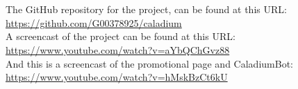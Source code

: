 \begin{appendices}
\renewcommand{\chaptername}{Appendix A}
\renewcommand{\thechapter}{A}
\chapter{}
The GitHub repository for the project, can be found at this URL: \\
\href{https://github.com/G00378925/caladium}{https://github.com/G00378925/caladium} \\

A screencast of the project can be found at this URL: \\
\href{https://www.youtube.com/watch?v=aYbQChGvz88}{https://www.youtube.com/watch?v=aYbQChGvz88} \\

And this is a screencast of the promotional page and CaladiumBot: \\
\href{https://www.youtube.com/watch?v=hMskBzCt6kU}{https://www.youtube.com/watch?v=hMskBzCt6kU}

\renewcommand{\chaptername}{Appendix B}
\renewcommand{\thechapter}{B}
\chapter{}


\end{appendices}
